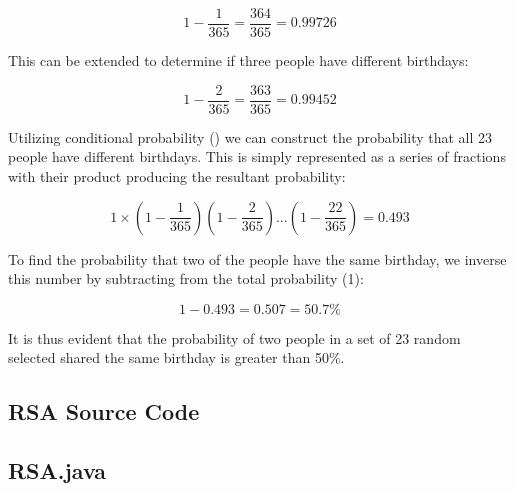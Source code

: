 \documentclass[]{article}
\begin{document}
$$1-\frac{1}{365}=\frac{364}{365}=0.99726$$

\vspace{0.5cm}
\noindent
This can be extended to determine if three people have different birthdays:

$$1-\frac{2}{365}=\frac{363}{365}=0.99452$$

\vspace{0.5cm}
\noindent
Utilizing conditional probability (\cite{lecture2}) we can construct the probability that all 23 people have different birthdays. This is simply represented as a series of fractions with their product producing the resultant probability:

$$1\times(1-\frac{1}{365})(1-\frac{2}{365})...(1-\frac{22}{365})=0.493$$

\vspace{0.5cm}
\noindent
To find the probability that two of the people have the same birthday, we inverse this number by subtracting from the total probability (1):

$$1-0.493=0.507=50.7\%$$

\vspace{0.5cm}
\noindent
It is thus evident that the probability of two people in a set of 23 random selected shared the same birthday is greater than 50\%.

\pagebreak


\vspace*{-0.8cm}
\begin{center}
	\section*{RSA Source Code}
\end{center}

\subsection*{RSA.java}
\pagebreak{}


\break
\setlength{}
\printbibliography[title={References}]

\end{document}
